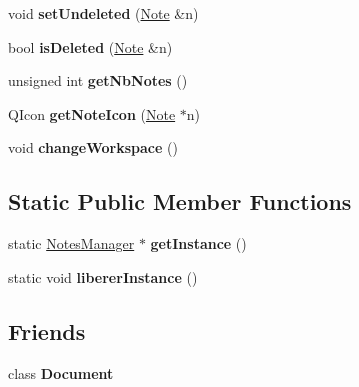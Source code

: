 \begin{DoxyCompactItemize}
\item 
\hypertarget{classNotesManager_aa3cc4234acf0e4055a1159348ac01ae0}{void {\bfseries set\-Undeleted} (\hyperlink{classNote}{\-Note} \&n)}\label{classNotesManager_aa3cc4234acf0e4055a1159348ac01ae0}

\item 
\hypertarget{classNotesManager_a8a2a291206a92186102c0a748b348830}{bool {\bfseries is\-Deleted} (\hyperlink{classNote}{\-Note} \&n)}\label{classNotesManager_a8a2a291206a92186102c0a748b348830}

\item 
\hypertarget{classNotesManager_a49b47e2469bc3f6c34a32d160e69ec1d}{unsigned int {\bfseries get\-Nb\-Notes} ()}\label{classNotesManager_a49b47e2469bc3f6c34a32d160e69ec1d}

\item 
\hypertarget{classNotesManager_add6ea86f4a824189c6d05ceaeb0e66bb}{\-Q\-Icon {\bfseries get\-Note\-Icon} (\hyperlink{classNote}{\-Note} $\ast$n)}\label{classNotesManager_add6ea86f4a824189c6d05ceaeb0e66bb}

\item 
\hypertarget{classNotesManager_a5b04a079b9889741a93d1c34d3cc88ae}{void {\bfseries change\-Workspace} ()}\label{classNotesManager_a5b04a079b9889741a93d1c34d3cc88ae}

\end{DoxyCompactItemize}
\subsection*{\-Static \-Public \-Member \-Functions}
\begin{DoxyCompactItemize}
\item 
\hypertarget{classNotesManager_ad1a91e51ba8506c7ae7cd60d06bd075f}{static \hyperlink{classNotesManager}{\-Notes\-Manager} $\ast$ {\bfseries get\-Instance} ()}\label{classNotesManager_ad1a91e51ba8506c7ae7cd60d06bd075f}

\item 
\hypertarget{classNotesManager_abd12bae3c990a408e9ef55aa0d93b675}{static void {\bfseries liberer\-Instance} ()}\label{classNotesManager_abd12bae3c990a408e9ef55aa0d93b675}

\end{DoxyCompactItemize}
\subsection*{\-Friends}
\begin{DoxyCompactItemize}
\item 
\hypertarget{classNotesManager_a883538034e58fc5c0de7d4e4cab3cef7}{class {\bfseries \-Document}}\label{classNotesManager_a883538034e58fc5c0de7d4e4cab3cef7}

\end{DoxyCompactItemize}


